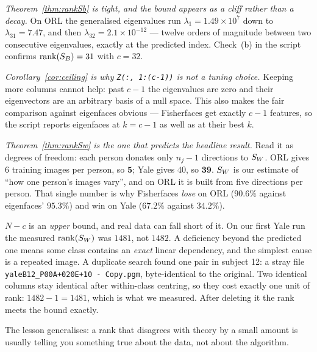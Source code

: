 \begin{observation}
\emph{Theorem~\ref{thm:rankSb} is tight, and the bound appears as a cliff rather
than a decay.} On ORL the generalised eigenvalues run
$\lambda_{1} = 1.49\times10^{7}$ down to $\lambda_{31} = 7.47$, and then
$\lambda_{32} = 2.1\times10^{-12}$ --- twelve orders of magnitude between two
consecutive eigenvalues, exactly at the predicted index. Check~(b) in the
script confirms $\operatorname{rank}(S_B) = 31$ with $c = 32$.

\emph{Corollary~\ref{cor:ceiling} is why \texttt{Z(:, 1:(c-1))} is not a tuning
choice.} Keeping more columns cannot help: past $c-1$ the eigenvalues are zero
and their eigenvectors are an arbitrary basis of a null space. This also makes
the fair comparison against eigenfaces obvious --- Fisherfaces get exactly
$c-1$ features, so the script reports eigenfaces at $k = c-1$ as well as at
their best $k$.

\emph{Theorem~\ref{thm:rankSw} is the one that predicts the headline result.}
Read it as degrees of freedom: each person donates only $n_j - 1$ directions to
$S_W$. ORL gives $6$ training images per person, so $\mathbf{5}$; Yale gives
$40$, so $\mathbf{39}$. $S_W$ is our estimate of ``how one person's images
vary'', and on ORL it is built from five directions per person. That single
number is why Fisherfaces \emph{lose} on ORL ($90.6\%$ against eigenfaces'
$95.3\%$) and win on Yale ($67.2\%$ against $34.2\%$).
\end{observation}

\begin{gotcha}
$N-c$ is an \emph{upper} bound, and real data can fall short of it. On our
first Yale run the measured $\operatorname{rank}(S_W)$ was $1481$, not $1482$. A deficiency
beyond the predicted one means some class contains an \emph{exact} linear
dependency, and the simplest cause is a repeated image. A duplicate search
found one pair in subject 12: a stray file
\texttt{yaleB12\_P00A+020E+10 - Copy.pgm}, byte-identical to the original. Two
identical columns stay identical after within-class centring, so they cost
exactly one unit of rank: $1482 - 1 = 1481$, which is what we measured. After
deleting it the rank meets the bound exactly.

The lesson generalises: a rank that disagrees with theory by a small amount is
usually telling you something true about the data, not about the algorithm.
\end{gotcha}

